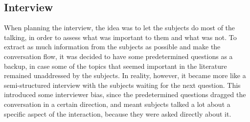 \subsection{Interview}
When planning the interview, the idea was to let the subjects do most of the talking, in order to assess what was important to them and what was not. To extract as much information from the subjects as possible and make the conversation flow, it was decided to have some predetermined questions as a backup, in case some of the topics that seemed important in the literature remained unaddressed by the subjects. In reality, however, it became more like a semi-structured interview with the subjects waiting for the next question. This introduced some interviewer bias, since the predetermined questions dragged the conversation in a certain direction, and meant subjects talked a lot about a specific aspect of the interaction, because they were asked directly about it.